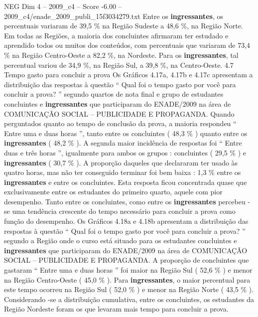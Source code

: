 \begin{textsample}{NEG Dim 4 – 2009\_c4 – Score -6.00 – 2009\_c4/enade\_2009\_publi\_15f3034279.txt}
Entre os \textbf{ingressantes}, os percentuais variaram de 39,5 \% na Região Sudeste a 48,6 \%, na Região Norte.
Em todas as Regiões, a maioria dos concluintes afirmaram ter estudado e aprendido todos ou muitos dos conteúdos, com percentuais que variaram de 73,4 \% na Região Centro-Oeste a 82,2 \%, na Nordeste.
Para os \textbf{ingressantes}, tal percentual variou de 34,9 \%, na Região Sul, a 39,8 \%, na Centro-Oeste. 4.7 Tempo gasto para concluir a prova Os Gráficos 4.17a, 4.17b e 4.17c apresentam a distribuição das respostas à questão “ Qual foi o tempo gasto por você para concluir a prova? ” segundo quartos de nota final e grupo de estudantes concluintes e \textbf{ingressantes} que participaram do ENADE/2009 na área de COMUNICAÇÃO SOCIAL – PUBLICIDADE E PROPAGANDA.
Quando perguntados quanto ao tempo de conclusão da prova, a maioria respondeu “ Entre uma e duas horas ”, tanto entre os concluintes ( 48,3 \% ) quanto entre os \textbf{ingressantes} ( 48,2 \% ).
A segunda maior incidência de respostas foi “ Entre duas e três horas ”, igualmente para ambos os grupos : concluintes ( 29,5 \% ) e \textbf{ingressantes} ( 30,7 \% ).
A proporção daqueles que declararam ter usado às quatro horas, mas não ter conseguido terminar foi bem baixa : 1,3 \% entre os \textbf{ingressantes} e entre os concluintes.
Esta resposta ficou concentrada quase que exclusivamente entre os estudantes do primeiro quarto, aquele com pior desempenho.
Tanto entre os concluintes, como entre os \textbf{ingressantes} percebeu -se uma tendência crescente do tempo necessário para concluir a prova como função do desempenho.
Os Gráficos 4.18a e 4.18b apresentam a distribuição das respostas à questão “ Qual foi o tempo gasto por você para concluir a prova? ” segundo a Região onde o curso está situado para os estudantes concluintes e \textbf{ingressantes} que participaram do ENADE/2009 na área de COMUNICAÇÃO SOCIAL – PUBLICIDADE E PROPAGANDA.
A proporção de concluintes que gastaram “ Entre uma e duas horas ” foi maior na Região Sul ( 52,6 \% ) e menor na Região Centro-Oeste ( 45,0 \% ).
Para \textbf{ingressantes}, o maior percentual para este tempo ocorreu na Região Sul ( 52,0 \% ) e menor na Região Norte ( 43,5 \% ).
Considerando -se a distribuição cumulativa, entre os concluintes, os estudantes da Região Nordeste foram os que levaram mais tempo para concluir a prova.

\end{textsample}
